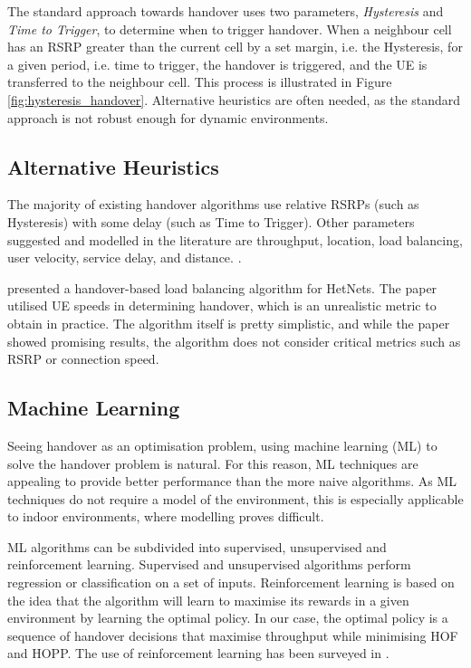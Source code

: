 The standard approach towards handover uses two parameters, \textit{Hysteresis} and \textit{Time to Trigger}, to determine when to trigger handover. When a neighbour cell has an RSRP greater than the current cell by a set margin, i.e. the Hysteresis, for a given period, i.e. time to trigger, the handover is triggered, and the UE is transferred to the neighbour cell. This process is illustrated in Figure \ref{fig:hysteresis_handover}. Alternative heuristics are often needed, as the standard approach is not robust enough for dynamic environments.



\clearpage %

\subsection{Alternative Heuristics}
The majority of existing handover algorithms use relative RSRPs (such as Hysteresis) with some delay (such as Time to Trigger). Other parameters suggested and modelled in the literature are throughput, location, load balancing, user velocity, service delay, and distance. \cite{nyangaresi_efficient_2022}.

\citet{hatipoglu_handover-based_2020} presented a handover-based load balancing algorithm for HetNets. The paper utilised UE speeds in determining handover, which is an unrealistic metric to obtain in practice. The algorithm itself is pretty simplistic, and while the paper showed promising results, the algorithm does not consider critical metrics such as RSRP or connection speed.

\subsection{Machine Learning}
Seeing handover as an optimisation problem, using machine learning (ML) to solve the handover problem is natural. For this reason, ML techniques are appealing to provide better performance than the more naive algorithms. As ML techniques do not require a model of the environment, this is especially applicable to indoor environments, where modelling proves difficult.

ML algorithms can be subdivided into supervised, unsupervised and reinforcement learning. Supervised and unsupervised algorithms perform regression or classification on a set of inputs. Reinforcement learning is based on the idea that the algorithm will learn to maximise its rewards in a given environment by learning the optimal policy. In our case, the optimal policy is a sequence of handover decisions that maximise throughput while minimising HOF and HOPP. The use of reinforcement learning has been surveyed in \cite{mollel_survey_2021}.

